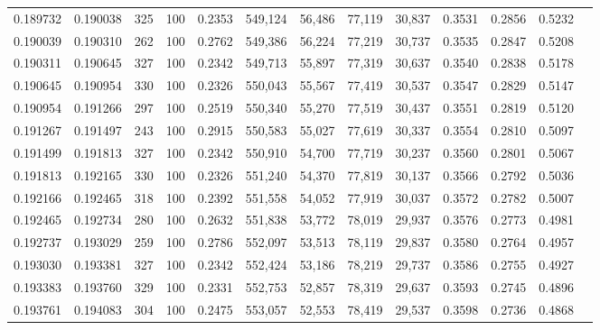 \begin{tabular}{rrrrrrrrrrrrr}
0.189732 & 0.190038 &   325 & 100 &                                     0.2353 & 549,124 &  56,486 &  77,119 &  30,837 & 0.3531 & 0.2856 & 0.5232 \\
0.190039 & 0.190310 &   262 & 100 &                                     0.2762 & 549,386 &  56,224 &  77,219 &  30,737 & 0.3535 & 0.2847 & 0.5208 \\
0.190311 & 0.190645 &   327 & 100 &                                     0.2342 & 549,713 &  55,897 &  77,319 &  30,637 & 0.3540 & 0.2838 & 0.5178 \\
0.190645 & 0.190954 &   330 & 100 &                                     0.2326 & 550,043 &  55,567 &  77,419 &  30,537 & 0.3547 & 0.2829 & 0.5147 \\
0.190954 & 0.191266 &   297 & 100 &                                     0.2519 & 550,340 &  55,270 &  77,519 &  30,437 & 0.3551 & 0.2819 & 0.5120 \\
0.191267 & 0.191497 &   243 & 100 &                                     0.2915 & 550,583 &  55,027 &  77,619 &  30,337 & 0.3554 & 0.2810 & 0.5097 \\
0.191499 & 0.191813 &   327 & 100 &                                     0.2342 & 550,910 &  54,700 &  77,719 &  30,237 & 0.3560 & 0.2801 & 0.5067 \\
0.191813 & 0.192165 &   330 & 100 &                                     0.2326 & 551,240 &  54,370 &  77,819 &  30,137 & 0.3566 & 0.2792 & 0.5036 \\
0.192166 & 0.192465 &   318 & 100 &                                     0.2392 & 551,558 &  54,052 &  77,919 &  30,037 & 0.3572 & 0.2782 & 0.5007 \\
0.192465 & 0.192734 &   280 & 100 &                                     0.2632 & 551,838 &  53,772 &  78,019 &  29,937 & 0.3576 & 0.2773 & 0.4981 \\
0.192737 & 0.193029 &   259 & 100 &                                     0.2786 & 552,097 &  53,513 &  78,119 &  29,837 & 0.3580 & 0.2764 & 0.4957 \\
0.193030 & 0.193381 &   327 & 100 &                                     0.2342 & 552,424 &  53,186 &  78,219 &  29,737 & 0.3586 & 0.2755 & 0.4927 \\
0.193383 & 0.193760 &   329 & 100 &                                     0.2331 & 552,753 &  52,857 &  78,319 &  29,637 & 0.3593 & 0.2745 & 0.4896 \\
0.193761 & 0.194083 &   304 & 100 &                                     0.2475 & 553,057 &  52,553 &  78,419 &  29,537 & 0.3598 & 0.2736 & 0.4868 \\

\end{tabular}
